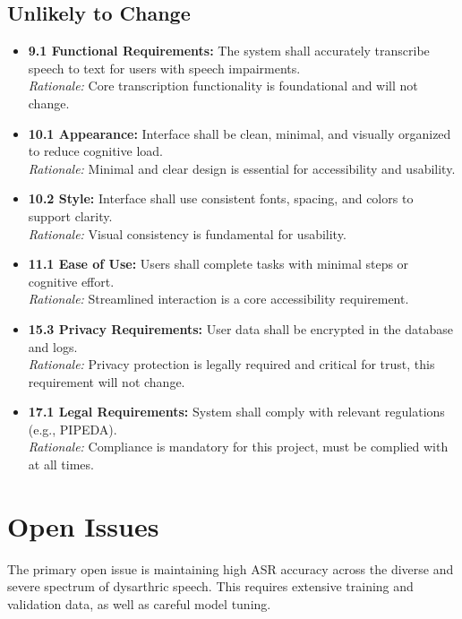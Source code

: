 \documentclass[11pt]{article}
\begin{document}
\subsection{Unlikely to Change}
\begin{itemize}
    \item \textbf{9.1 Functional Requirements:} The system shall accurately transcribe speech to text for users with speech impairments.\\
    \textit{Rationale:} Core transcription functionality is foundational and will not change.

    \item \textbf{10.1 Appearance:} Interface shall be clean, minimal, and visually organized to reduce cognitive load.\\
    \textit{Rationale:} Minimal and clear design is essential for accessibility and usability.

    \item \textbf{10.2 Style:} Interface shall use consistent fonts, spacing, and colors to support clarity.\\
    \textit{Rationale:} Visual consistency is fundamental for usability.

    \item \textbf{11.1 Ease of Use:} Users shall complete tasks with minimal steps or cognitive effort.\\
    \textit{Rationale:} Streamlined interaction is a core accessibility requirement.

    \item \textbf{15.3 Privacy Requirements:} User data shall be encrypted in the database and logs. \\
    \textit{Rationale:} Privacy protection is legally required and critical for trust, this requirement will not change.

    \item \textbf{17.1 Legal Requirements:} System shall comply with relevant regulations (e.g., PIPEDA).\\
    \textit{Rationale:} Compliance is mandatory for this project, must be complied with at all times.

\end{itemize}

\section{Open Issues}
The primary open issue is maintaining high ASR accuracy across the diverse and severe spectrum of dysarthric speech. This requires extensive training and validation data, as well as careful model tuning.
\end{document}
